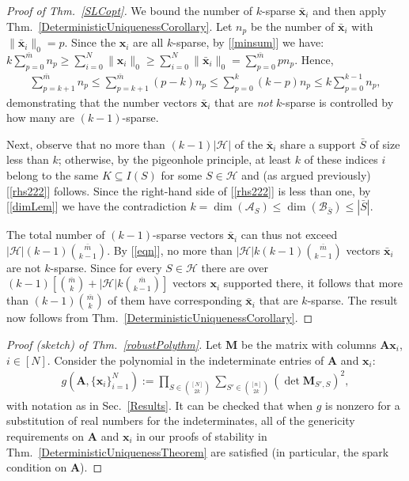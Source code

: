 \documentclass[9pt,twocolumn]{pnas-new}
\renewcommand{\eqref}[1]{\textnormal{[\ref{#1}]}}
\begin{document}
\begin{proof}[Proof of Thm.~\ref{SLCopt}]
We bound the number of $k$-sparse $\mathbf{\bar x}_i$ and then apply Thm.~\ref{DeterministicUniquenessCorollary}. 
Let $n_p$ be the number of $\mathbf{\bar x}_i$ with $\|\mathbf{\bar x}_i\|_0 = p$.
Since the $\mathbf{x}_i$ are all $k$-sparse, by \eqref{minsum} we have:
\mbox{$k \sum_{p = 0}^{\bar m} n_p \geq \sum_{i=0}^N \|\mathbf{x}_i\|_0 \geq \sum_{i=0}^N \|\mathbf{\bar x}_i\|_0 = \sum_{p=0}^{\bar m} p n_p.$}
Hence,
\begin{align}\label{eqn}
\sum_{p = k+1}^{\bar m} n_p \leq \sum_{p = k+1}^{\bar m} (p-k) n_p \leq \sum_{p = 0}^k (k-p)n_p \leq k \sum_{p = 0}^{k-1} n_p,
\end{align}
%
demonstrating that the number vectors $\mathbf{\bar x}_i$ that are \emph{not} $k$-sparse is controlled by how many are $(k-1)$-sparse. 

Next, observe that no more than $(k-1)|\mathcal{H}|$ of the $\mathbf{\bar x}_i$ share a support $\bar S$ of size less than $k$; otherwise, by the pigeonhole principle, at least $k$ of these indices $i$ belong to the same $K \subseteq I(S)$ for some $S \in \mathcal{H}$ and (as argued previously) \eqref{rhs222} follows. Since the right-hand side of \eqref{rhs222} is less than one, by \eqref{dimLem} we have the contradiction $k = \dim(\bm{\mathcal{A}}_S) \leq \dim(\bm{\mathcal{B}}_{\bar S}) \leq |\bar S|.$ 

The total number of $(k-1)$-sparse vectors $\mathbf{\bar x}_i$ can thus not exceed $|\mathcal{H}|(k-1){ \bar m \choose k-1}$. By \eqref{eqn}, no more than $|\mathcal{H}|k(k-1){ \bar m \choose k-1}$ vectors $\mathbf{\bar x}_i$ are not $k$-sparse. Since for every $S \in \mathcal{H}$ there are over $(k-1)\left[ {\bar m \choose k} + |\mathcal{H}|k{ \bar m \choose k-1} \right]$ vectors $\mathbf{x}_i$ supported there, it follows that more than $(k-1){\bar m \choose k}$ of them have corresponding $\mathbf{\bar x}_i$ that are $k$-sparse. The result now follows from Thm.~\ref{DeterministicUniquenessCorollary}.
\end{proof}

\begin{proof}[Proof (sketch) of Thm.~\ref{robustPolythm}]
Let $\textbf{M}$ be the matrix with columns $\mathbf{A}\mathbf{x}_i$, $i \in [N]$.  Consider the polynomial in the indeterminate entries of $\mathbf{A}$ and $\mathbf{x}_i$:
\begin{align*}
g(\mathbf{A}, \{\mathbf{x}_i\}_{i=1}^N) := \prod_{S \in {[N] \choose 2k}} \sum_{S' \in {[n] \choose 2k}} (\det \textbf{M}_{S',S})^2,
\end{align*}
with notation as in Sec.~\ref{Results}.  
It can be checked that when $g$ is nonzero for a substitution of real numbers for the indeterminates, all of the genericity requirements on $\mathbf{A}$ and $\mathbf{x}_i$ in our proofs of stability in Thm.~\ref{DeterministicUniquenessTheorem} are satisfied (in particular, the spark condition on $\mathbf{A}$).
\end{proof}
\end{document}

